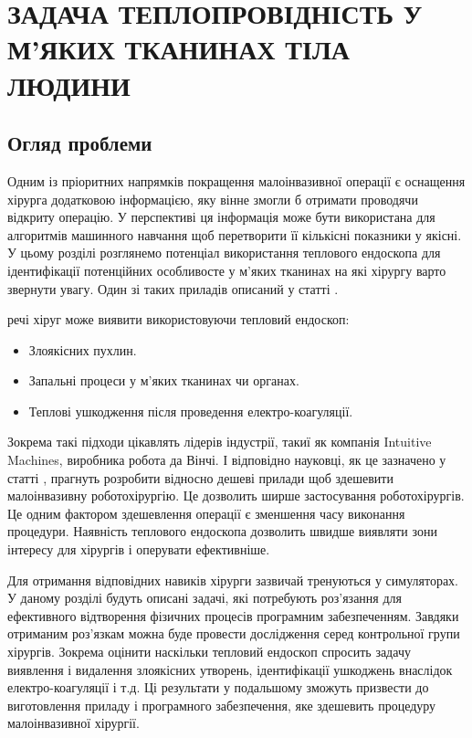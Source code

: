 \chapter{ЗАДАЧА ТЕПЛОПРОВІДНІСТЬ У М'ЯКИХ ТКАНИНАХ ТІЛА ЛЮДИНИ}

\nocite{bahvalov-et-al,tumor-thermal-model,lung-tumor-thermal-conductivity,database-tissue-properties} 

\section{Огляд проблеми}

Одним із пріоритних напрямків покращення малоінвазивної операції є оснащення хірурга додатковою інформацією, яку
він не змогли б отримати проводячи відкриту операцію. У перспективі ця інформація може бути
використана для алгоритмів машинного навчання щоб перетворити її кількісні показники у якісні. У цьому розділі
розглянемо потенціал використання теплового ендоскопа для ідентифікації потенційних особливосте у м'яких тканинах на які
хірургу варто звернути увагу. Один зі таких приладів описаний у статті \cite{thermal-endoscope-concept}.

 речі хіруг може виявити використовуючи тепловий ендоскоп:
\begin{itemize}
    \item Злоякісних пухлин.
    \item Запальні процеси у м'яких тканинах чи органах.
    \item Теплові ушкодження після проведення електро-коагуляції.
\end{itemize}

Зокрема такі підходи цікавлять лідерів індустрії, такиї як компанія Intuitive Machines, виробника робота да Вінчі. І 
відповідно науковці, як це зазначено у статті \cite{thermal-endoscope-concept}, прагнуть розробити відносно дешеві 
прилади щоб здешевити малоінвазивну роботохірургію. Це дозволить ширше застосування роботохірургів. Це одним фактором 
здешевлення операції є зменшення часу виконання процедури. Наявність теплового ендоскопа дозволить швидше виявляти зони 
інтересу для хірургів і оперувати ефективніше.

Для отримання відповідних навиків хірурги зазвичай тренуються у симуляторах. У даному розділі будуть описані задачі, які
потребують роз'язання для ефективного відтворення фізичних процесів програмним забезпеченням. Завдяки отриманим 
роз'язкам можна буде провести дослідження серед контрольної групи хірургів. Зокрема оцінити наскільки тепловий ендоскоп 
спросить задачу виявлення і видалення злоякісних утворень, ідентифікації ушкоджень внаслідок електро-коагуляції і т.д. 
Ці результати у подальшому зможуть призвести до виготовлення приладу і програмного забезпечення, яке здешевить процедуру  
малоінвазивної хірургії.

